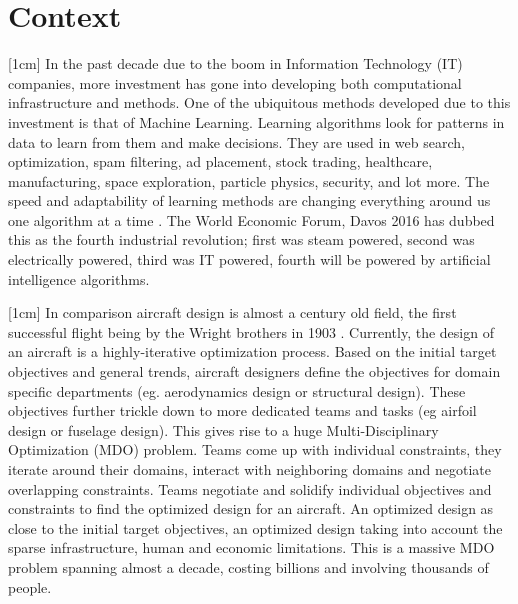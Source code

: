 \chapter{Context}
\label{chapIntroduction}

[1cm]
In the past decade due to the boom in Information Technology (IT) companies, more investment has gone into developing both computational infrastructure and methods. One of the ubiquitous methods developed due to this investment is that of Machine Learning. Learning algorithms look for patterns in data to learn from them and make decisions. They are used in web search, optimization, spam filtering, ad placement, stock trading, healthcare, manufacturing, space exploration, particle physics, security, and lot more. The speed and adaptability of learning methods are changing everything around us one algorithm at a time \cite{domingos2015master}. The World Economic Forum, Davos 2016 \cite{schwab2016fourth} has dubbed this as the fourth industrial revolution; first was steam powered, second was electrically powered, third was IT powered, fourth will be powered by artificial intelligence algorithms.

[1cm]
In comparison aircraft design is almost a century old field, the first successful flight being by the Wright brothers in 1903 \cite{wright1934we}. Currently, the design of an aircraft is a highly-iterative optimization process. Based on the initial target objectives and general trends, aircraft designers define the objectives for domain specific departments (eg. aerodynamics design or structural design). These objectives further trickle down to more dedicated teams and tasks (eg airfoil design or fuselage design). This gives rise to a huge Multi-Disciplinary Optimization (MDO) problem. Teams come up with individual constraints, they iterate around their domains, interact with neighboring domains and negotiate overlapping constraints. Teams negotiate and solidify individual objectives and constraints to find the optimized design for an aircraft. An optimized design as close to the initial target objectives, an optimized design taking into account the sparse infrastructure, human and economic limitations. This is a massive MDO problem spanning almost a decade, costing billions and involving thousands of people. 

